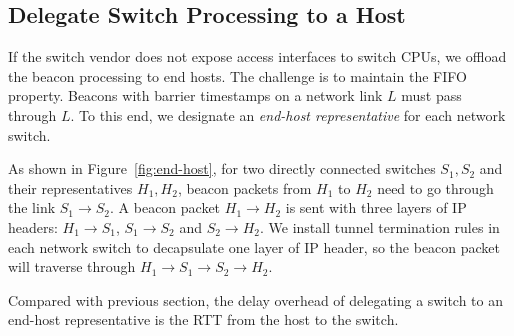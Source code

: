 \subsection{Delegate Switch Processing to a Host}
\label{sec:end-host}

If the switch vendor does not expose access interfaces to switch CPUs, we offload the beacon processing to end hosts. The challenge is to maintain the FIFO property. Beacons with barrier timestamps on a network link $L$ must pass through $L$. To this end, we designate an \textit{end-host representative} for each network switch. %

As shown in Figure~\ref{fig:end-host}, for two directly connected switches $S_1, S_2$ and their representatives $H_1, H_2$, beacon packets from $H_1$ to $H_2$ need to go through the link $S_1 \rightarrow S_2$. A beacon packet $H_1 \rightarrow H_2$ is sent with three layers of IP headers: $H_1 \rightarrow S_1$, $S_1 \rightarrow S_2$ and $S_2 \rightarrow H_2$.
We install tunnel termination rules in each network switch to decapsulate one layer of IP header, so the beacon packet will traverse through $H_1 \rightarrow S_1 \rightarrow S_2 \rightarrow H_2$.

Compared with previous section, the delay overhead of delegating a switch to an end-host representative is the RTT from the host to the switch.
